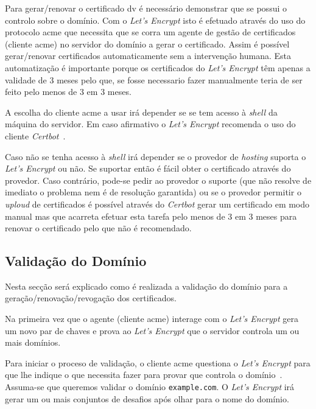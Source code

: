 Para gerar/renovar o certificado \acrshort{dv} é necessário demonstrar que se possui o controlo sobre o domínio. Com o \textit{Let's Encrypt} isto é efetuado através do uso do protocolo \acrfull{acme} que necessita que se corra um agente de gestão de certificados (cliente \acrshort{acme}) no servidor do domínio a gerar o certificado. Assim é possível gerar/renovar certificados automaticamente sem a intervenção humana. Esta automatização é importante porque os certificados do \textit{Let's Encrypt} têm apenas a validade de 3 meses pelo que, se fosse necessario fazer manualmente teria de ser feito pelo menos de 3 em 3 meses.

A escolha do cliente \acrshort{acme} a usar irá depender se se tem acesso à \textit{shell} da máquina do servidor. Em caso afirmativo o \textit{Let's Encrypt} recomenda o uso do cliente \textit{Certbot}~\cite{letEnc}.

Caso não se tenha acesso à \textit{shell} irá depender se o provedor de \textit{hosting} suporta o \textit{Let's Encrypt} ou não. Se suportar então é fácil obter o certificado através do provedor. Caso contrário, pode-se pedir ao provedor o suporte (que não resolve de imediato o problema nem é de resolução garantida) ou se o provedor permitir o \textit{uploud} de certificados é possível através do \textit{Certbot} gerar um certificado em modo manual mas que acarreta efetuar esta tarefa pelo menos de 3 em 3 meses para renovar o certificado pelo que não é recomendado.

\subsection{Validação do Domínio}

Nesta secção será explicado como é realizada a validação do domínio para a geração/renovação/revogação dos certificados.

Na primeira vez que o agente (cliente \acrshort{acme}) interage com o \textit{Let's Encrypt} gera um novo par de chaves e prova ao \textit{Let's Encrypt} que o servidor controla um ou mais domínios.~\cite{domainValidation}

Para iniciar o proceso de validação, o cliente \acrshort{acme} questiona o \textit{Let's Encrypt} para que lhe indique o que necessita fazer para provar que controla o domínio~\cite{domainValidation}. Assuma-se que queremos validar o domínio \texttt{example.com}.
O \textit{Let's Encrypt} irá gerar um ou mais conjuntos de desafios após olhar para o nome do domínio.

